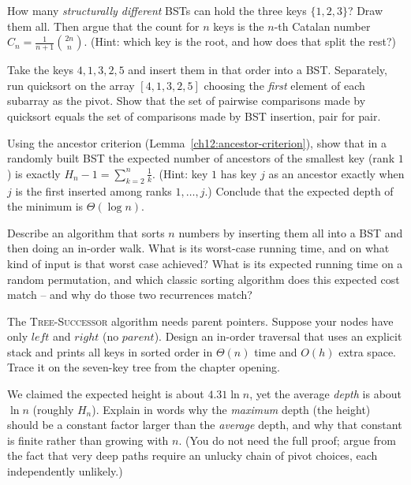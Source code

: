 \begin{exercise}
How many \emph{structurally different} BSTs can hold the three keys $\{1,2,3\}$? Draw them all.
Then argue that the count for $n$ keys is the $n$-th Catalan number $C_n =
\frac{1}{n+1}\binom{2n}{n}$. (Hint: which key is the root, and how does that split the rest?)
\end{exercise}

\begin{exercise}
Take the keys $4,1,3,2,5$ and insert them in that order into a BST. Separately, run quicksort on
the array $[4,1,3,2,5]$ choosing the \emph{first} element of each subarray as the pivot. Show
that the set of pairwise comparisons made by quicksort equals the set of comparisons made by BST
insertion, pair for pair.
\end{exercise}

\begin{exercise}
Using the ancestor criterion (Lemma~\ref{ch12:ancestor-criterion}), show that in a randomly
built BST the expected number of ancestors of the smallest key (rank $1$) is exactly
$H_n - 1 = \sum_{k=2}^{n}\frac1k$. (Hint: key $1$ has key $j$ as an ancestor exactly when $j$ is
the first inserted among ranks $1,\dots,j$.) Conclude that the expected depth of the minimum is
$\Theta(\log n)$.
\end{exercise}

\begin{exercise}
Describe an algorithm that sorts $n$ numbers by inserting them all into a BST and then doing an
in-order walk. What is its worst-case running time, and on what kind of input is that worst case
achieved? What is its expected running time on a random permutation, and which classic sorting
algorithm does this expected cost match -- and why do those two recurrences match?
\end{exercise}

\begin{exercise}
The \textsc{Tree-Successor} algorithm needs parent pointers. Suppose your nodes have only
$left$ and $right$ (no $parent$). Design an in-order traversal that uses an explicit stack and
prints all keys in sorted order in $\Theta(n)$ time and $O(h)$ extra space. Trace it on the
seven-key tree from the chapter opening.
\end{exercise}

\begin{exercise}
We claimed the expected height is about $4.31\ln n$, yet the average \emph{depth} is about
$\ln n$ (roughly $H_n$). Explain in words why the \emph{maximum} depth (the height) should be a
constant factor larger than the \emph{average} depth, and why that constant is finite rather
than growing with $n$. (You do not need the full proof; argue from the fact that very deep paths
require an unlucky chain of pivot choices, each independently unlikely.)
\end{exercise}
